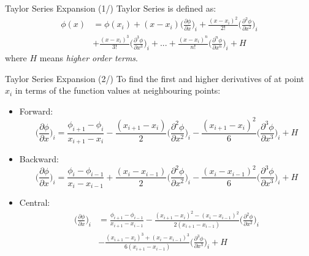 \begin{frame}{Taylor Series Expansion (1/)}
Taylor Series is defined as:
\begin{align*}
    \phi(x) &= 
    \phi(x_{i}) + (x-x_{i})\bigg(\frac{\partial \phi}{\partial x}\bigg)_{i}
    + \frac{(x-x_{i})^{2}}{2!}\bigg(\frac{\partial^{2} \phi}{\partial x^{2}}\bigg)_{i}  \\
    & +\frac{(x-x_{i})^{3}}{3!}\bigg(\frac{\partial^{3} \phi}{\partial x^{3}}\bigg)_{i} + ... 
    + \frac{(x-x_{i})^{n}}{n!}\bigg(\frac{\partial^{n} \phi}{\partial x^{n}}\bigg)_{i} + H
\end{align*}
where $H$ means \textit{higher order terms}.
\end{frame}

\begin{frame}{Taylor Series Expansion (2/)}
To find the first and higher derivatives of at point $x_{i}$ in terms of the function values at neighbouring points:
\begin{itemize}
    \item Forward:
    \[ \bigg(\frac{\partial \phi}{\partial x}\bigg)_{i} = 
    \frac{\phi_{i+1}-\phi_{i}}{x_{i+1}-x_{i}}
    - \frac{(x_{i+1}-x_{i})}{2}\bigg(\frac{\partial^{2} \phi}{\partial x^{2}}\bigg)_{i}
    -\frac{(x_{i+1}-x_{i})^{2}}{6}\bigg(\frac{\partial^{3} \phi}{\partial x^{3}}\bigg)_{i} + H\]   
    
    \item Backward:
    \[ \bigg(\frac{\partial \phi}{\partial x}\bigg)_{i} = 
    \frac{\phi_{i}-\phi_{i-1}}{x_{i}-x_{i-1}}
    + \frac{(x_{i}-x_{i-1})}{2}\bigg(\frac{\partial^{2} \phi}{\partial x^{2}}\bigg)_{i}
    -\frac{(x_{i}-x_{i-1})^{2}}{6}\bigg(\frac{\partial^{3} \phi}{\partial x^{3}}\bigg)_{i} + H\]  
    
    \item Central:
    \begin{align*}
    \bigg(\frac{\partial \phi}{\partial x}\bigg)_{i} &= 
    \frac{\phi_{i+1}-\phi_{i-1}}{x_{i+1}-x_{i-1}}
    - \frac{(x_{i+1}-x_{i})^{2} - (x_{i}-x_{i-1})^{2}}{2(x_{i+1}-x_{i-1})}\bigg(\frac{\partial^{2} \phi}{\partial x^{2}}\bigg)_{i}\\
    & -\frac{(x_{i+1}-x_{i})^{3} + (x_{i}-x_{i-1})^{3}}{6(x_{i+1}-x_{i-1})}\bigg(\frac{\partial^{3} \phi}{\partial x^{3}}\bigg)_{i} + H
    \end{align*}
\end{itemize}
\end{frame}

